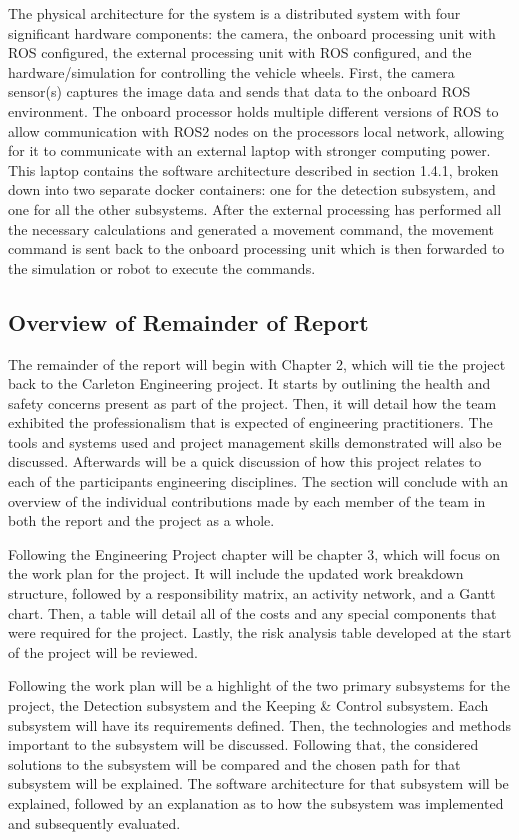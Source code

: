 \documentclass[titlepage,draft]{article}
\begin{document}
The physical architecture for the system is a distributed system with four significant hardware components: the camera, the onboard processing unit with ROS configured, the external processing unit with ROS configured, and the hardware/simulation for controlling the vehicle wheels. First, the camera sensor(s) captures the image data and sends that data to the onboard ROS environment. The onboard processor holds multiple different versions of ROS to allow communication with ROS2 nodes on the processors local network, allowing for it to communicate with an external laptop with stronger computing power. This laptop contains the software architecture described in section 1.4.1, broken down into two separate docker containers: one for the detection subsystem, and one for all the other subsystems. After the external processing has performed all the necessary calculations and generated a movement command, the movement command is sent back to the onboard processing unit which is then forwarded to the simulation or robot to execute the commands.

\subsection{Overview of Remainder of Report}

The remainder of the report will begin with Chapter 2, which will tie the project back to the Carleton Engineering project. It starts by outlining the health and safety concerns present as part of the project. Then, it will detail how the team exhibited the professionalism that is expected of engineering practitioners. The tools and systems used and project management skills demonstrated will also be discussed. Afterwards will be a quick discussion of how this project relates to each of the participants engineering disciplines. The section will conclude with an overview of the individual contributions made by each member of the team in both the report and the project as a whole.

Following the Engineering Project chapter will be chapter 3, which will focus on the work plan for the project. It will include the updated work breakdown structure, followed by a responsibility matrix, an activity network, and a Gantt chart. Then, a table will detail all of the costs and any special components that were required for the project. Lastly, the risk analysis table developed at the start of the project will be reviewed.

Following the work plan will be a highlight of the two primary subsystems for the project, the Detection subsystem and the Keeping \& Control subsystem. Each subsystem will have its requirements defined. Then, the technologies and methods important to the subsystem will be discussed. Following that, the considered solutions to the subsystem will be compared and the chosen path for that subsystem will be explained. The software architecture for that subsystem will be explained, followed by an explanation as to how the subsystem was implemented and subsequently evaluated.
\end{document}
